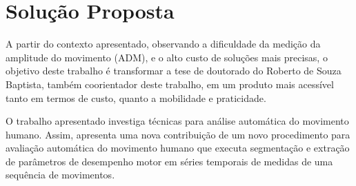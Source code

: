                                                                                   
\section{Solução Proposta}                                                      
\label{Sec:SolucaoProposta}
  
  A partir do contexto apresentado, observando a dificuldade da medição da 
amplitude do movimento (ADM), e o alto custo de soluções mais precisas, o 
objetivo deste trabalho é transformar a tese de doutorado do Roberto de Souza 
Baptista, também coorientador deste trabalho, em um produto mais acessível 
tanto em termos de custo, quanto a mobilidade e praticidade.
                                                            
  O trabalho apresentado investiga técnicas para análise automática do
movimento humano. Assim, apresenta uma nova contribuição de um novo 
procedimento para avaliação automática do movimento humano que executa 
segmentação e extração de parâmetros de desempenho motor em séries temporais 
de medidas de uma sequência de movimentos.
  
